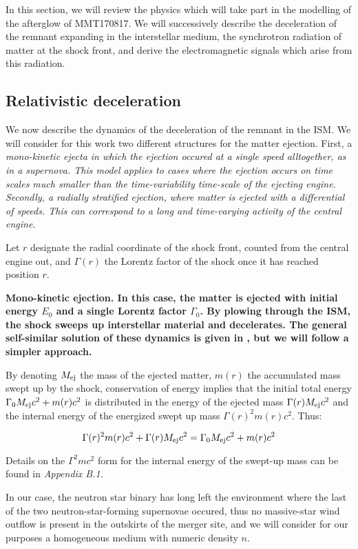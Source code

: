 In this section, we will review the physics which will take part in the modelling of the afterglow of MMT170817. We will successively describe the deceleration of the remnant expanding in the interstellar medium, the synchrotron radiation of matter at the shock front, and derive the electromagnetic signals which arise from this radiation.

\subsection{Relativistic deceleration}
\label{dynamic}
We now describe the dynamics of the deceleration of the remnant in the ISM. We will consider for this work two different structures for the matter ejection. First, a \it{mono-kinetic ejecta} in which the ejection occured at a single speed alltogether, as in a supernova. This model applies to cases where the ejection occurs on time scales much smaller than the time-variability time-scale of the ejecting engine. Secondly, a \it{radially stratified ejection}, where matter is ejected with a differential of speeds. This can correspond to a long and time-varying activity of the central engine.

Let $r$ designate the radial coordinate of the shock front, counted from the central engine out, and $\Gamma(r)$ the Lorentz factor of the shock once it has reached position $r$.

\bf{Mono-kinetic ejection.} In this case, the matter is ejected with initial energy $E_0$ and a single Lorentz factor $\Gamma_0$. By plowing through the ISM, the shock sweeps up interstellar material and decelerates. The general self-similar solution of these dynamics is given in \cite{59}, but we will follow a simpler approach.

By denoting $M_{\rm{ej}}$ the mass of the ejected matter, $m(r)$ the accumulated mass swept up by the shock, conservation of energy implies that the initial total energy $\Gamma_0 M_{\rm{ej}} c^2 + m(r) c^2$ is distributed in the energy of the ejected mass $\Gamma(r) M_{\rm{ej}} c^2$ and the internal energy of the energized swept up mass $\Gamma(r)^2 m(r) c^2$. Thus:

$$\Gamma(r)^2 m(r) c^2 + \Gamma(r) M_{\rm{ej}} c^2 = \Gamma_0 M_{\rm{ej}} c^2 + m(r)c^2 $$

Details on the $\Gamma^2 m c ^2$ form for the internal energy of the swept-up mass can be found in \it{Appendix B.1}.

In our case, the neutron star binary has long left the environment where the last of the two neutron-star-forming supernovae occured, thus no massive-star wind outflow is present in the outskirts of the merger site, and we will consider for our purposes a homogeneous medium with numeric density $n$.

